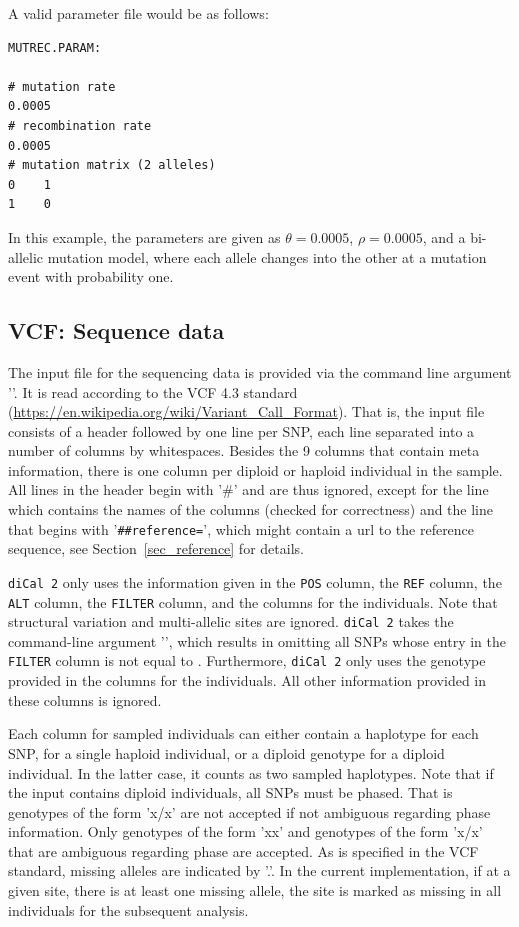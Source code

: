 \documentclass{article}
\numberwithin{equation}{section}
\begin{document}
A valid parameter file would be as follows:
\begin{verbatim}
MUTREC.PARAM:

# mutation rate
0.0005
# recombination rate
0.0005
# mutation matrix (2 alleles)
0    1
1    0
\end{verbatim}
In this example, the parameters are given as $\theta = 0.0005$, $\rho = 0.0005$, and a bi-allelic mutation model, where each allele changes into the other at a mutation event with probability one.

\subsection{VCF: Sequence data}
\label{sec_vcf}

The input file for the sequencing data is provided via the command line argument '\texttt{}'. It is read according to the VCF 4.3 standard (\url{https://en.wikipedia.org/wiki/Variant_Call_Format}). That is, the input file consists of a header followed by one line per SNP, each line separated into a number of columns by whitespaces. Besides the 9 columns that contain meta information, there is one column per diploid or haploid individual in the sample. All lines in the header begin with '\#' and are thus ignored, except for the line which contains the names of the columns (checked for correctness) and the line that begins with '\texttt{\#\#reference=}', which might contain a url to the reference sequence, see Section~\ref{sec_reference} for details.

\texttt{diCal 2} only uses the information given in the \texttt{POS} column, the \texttt{REF} column, the \texttt{ALT} column, the \texttt{FILTER} column, and the columns for the individuals. Note that structural variation and multi-allelic sites are ignored. \texttt{diCal 2} takes the command-line argument '\texttt{}', which results in omitting all SNPs whose entry in the \texttt{FILTER} column is not equal to \texttt{}. Furthermore, \texttt{diCal 2} only uses the genotype provided in the columns for the individuals. All other information provided in these columns is ignored.

Each column for sampled individuals can either contain a haplotype for each SNP, for a single haploid individual, or a diploid genotype for a diploid individual. In the latter case, it counts as two sampled haplotypes. Note that if the input contains diploid individuals, all SNPs must be phased. That is genotypes of the form 'x\slash x' are not accepted if not ambiguous regarding phase information. Only genotypes of the form 'x\textbar x' and genotypes of the form 'x\slash x' that are ambiguous regarding phase are accepted. As is specified in the VCF standard, missing alleles are indicated by '.'. In the current implementation, if at a given site, there is at least one missing allele, the site is marked as missing in all individuals for the subsequent analysis.
\end{document}
